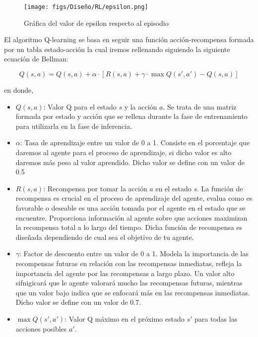 \begin{itemize}
 \begin{figure} [H]
  \begin{center}
    \texttt{[image: figs/Diseño/RL/epsilon.png]}
  \end{center}
  \caption{Gráfica del valor de epsilon respecto al episodio}
  \label{fig:epsilon}
\end{figure}
  \end{itemize}

  El algoritmo Q-learning se basa en seguir una función acción-recompensa formada por un tabla estado-acción la cual iremos rellenando siguiendo la siguiente ecuación
  de Bellman\cite{Bellman}:
  
  \begin{equation}
    Q(s, a) = Q(s, a) + \alpha \cdot [R(s, a) + \gamma \cdot \max Q(s', a') - Q(s, a)]
    \label{eq:bellman}
  \end{equation}

  en donde, 

  \begin{itemize}
    \item \textbf{$Q(s, a)$}: Valor Q para el estado $s$ y la acción $a$. Se trata de una matriz formada por estado y acción que se rellena durante la fase de entrenamiento para utilizarla
    en la fase de inferencia.
    \item \textbf{$\alpha$}: Tasa de aprendizaje entre un valor de 0 a 1. Consiste en el porcentaje que daremos al agente para el proceso de aprendizaje, 
    si dicho valor es alto daremos más peso al valor aprendido. Dicho valor se define con un valor de 0.5 
    \item \textbf{$R(s, a)$}: Recompensa por tomar la acción $a$ en el estado $s$. La función de recompensa es crucial en el proceso de aprendizaje del agente, evalua como es favorable o deseable
    es una acción tomada por el agente en el estado que se encuentre. Proporciona información al agente sobre que acciones maximizan la recompensa total a lo largo del tiempo. Dicha función
    de recompensa es diseñada dependiendo de cual sea el objetivo de tu agente. 
    \item \textbf{$\gamma$}: Factor de descuento entre un valor de 0 a 1. Modela la importancia de las recompensas futuras en relación con las recompensas inmediatas, refleja la importancia del agente
    por las recompensas a largo plazo. Un valor alto sifnigicará que le agente valorará mucho las recompensas futuras, mientras que un valor bajo indica que se enfocará más en las recompensas
    inmediatas. Dicho valor se define con un valor de 0.7.
    \item \textbf{$\max Q(s', a')$}: Valor Q máximo en el próximo estado $s'$ para todas las acciones posibles $a'$.
\end{itemize}

